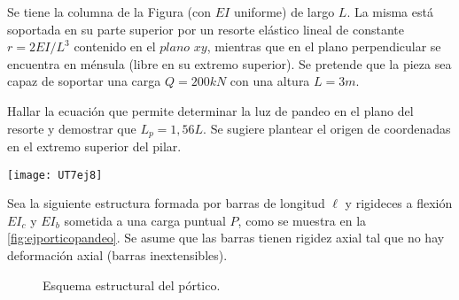 \ejercicio

Se tiene la columna de la Figura (con $EI$ uniforme) de largo $L$. La misma está soportada en su parte superior por un resorte elástico lineal de constante $r=2EI/L^3$ contenido en el $plano$ $xy$, mientras que en el plano perpendicular se encuentra en ménsula (libre en su extremo superior). Se pretende que la pieza sea capaz de soportar una carga $Q=200 kN$ con una altura $L=3m$.

Hallar la ecuación que permite determinar la luz de pandeo en el plano del resorte y demostrar que $L_p=1,56L$. Se sugiere plantear el origen de coordenadas en el extremo superior del pilar.

%

\begin{center}
	\texttt{[image: UT7ej8]}
\end{center}

%
%
%
%
%


\ejercicio

Sea la siguiente estructura formada por barras de longitud $\ell$ y rigideces a flexión $EI_c$ y $EI_b$ sometida a una carga puntual $P$, como se muestra en la \autoref{fig:ejporticopandeo}. Se asume que las barras tienen rigidez axial tal que no hay deformación axial (barras inextensibles).

\begin{figure}[H]
	\begin{center}
		\def\svgwidth{0.5\textwidth}
		
		\caption{Esquema estructural del pórtico.}
		\label{fig:ejporticopandeo}
	\end{center}
\end{figure} 

